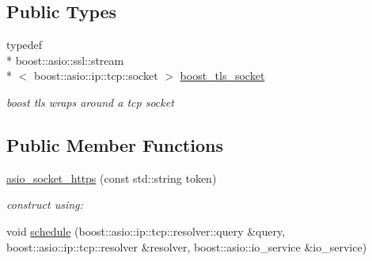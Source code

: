 \subsection*{Public Types}
\begin{DoxyCompactItemize}
\item 
typedef \\*
boost\-::asio\-::ssl\-::stream\\*
$<$ boost\-::asio\-::ip\-::tcp\-::socket $>$ \hyperlink{classrapp_1_1cloud_1_1asio__socket__https_a5c1860ee9dbd4b6b0a2e814c5c094b4e}{boost\-\_\-tls\-\_\-socket}
\begin{DoxyCompactList}\small\item\em boost tls wraps around a tcp socket \end{DoxyCompactList}\end{DoxyCompactItemize}
\subsection*{Public Member Functions}
\begin{DoxyCompactItemize}
\item 
\hyperlink{classrapp_1_1cloud_1_1asio__socket__https_a4101db28b271b576112a108152a0033c}{asio\-\_\-socket\-\_\-https} (const std\-::string token)
\begin{DoxyCompactList}\small\item\em construct using\-: \end{DoxyCompactList}\item 
void \hyperlink{classrapp_1_1cloud_1_1asio__socket__https_a079406a29a503416f44f11ceb18a37b1}{schedule} (boost\-::asio\-::ip\-::tcp\-::resolver\-::query \&query, boost\-::asio\-::ip\-::tcp\-::resolver \&resolver, boost\-::asio\-::io\-\_\-service \&io\-\_\-service)
\end{DoxyCompactItemize}
